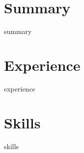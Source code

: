 \documentclass{article}
\begin{document}
\section*{Summary}
{{ summary }}

\section*{Experience}
{{ experience }}

\section*{Skills}
{{ skills }}
\end{document}
